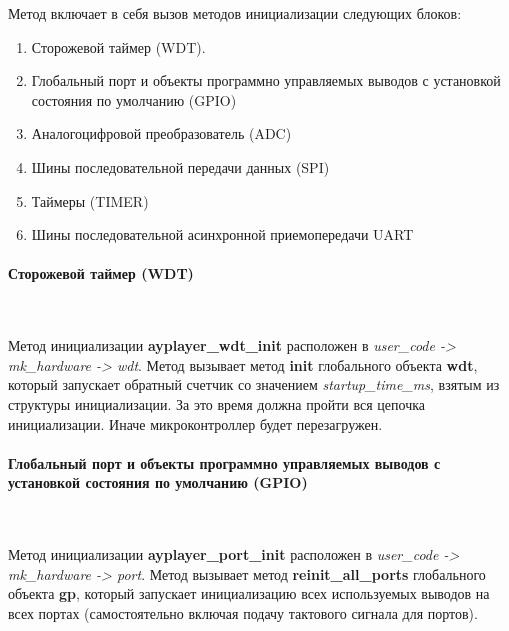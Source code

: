 \documentclass[a4paper, 12pt]{article}
\begin{document}
Метод включает в себя вызов методов инициализации следующих блоков:
\begin{enumerate}
	\item Сторожевой таймер (WDT).
	\item Глобальный порт и объекты программно управляемых выводов с установкой состояния по умолчанию (GPIO)
	\item Аналогоцифровой преобразователь (ADC)
	\item Шины последовательной передачи данных (SPI)
	\item Таймеры (TIMER)
	\item Шины последовательной асинхронной приемопередачи UART
\end{enumerate}
	
\paragraph{Сторожевой таймер (WDT)}~\

Метод инициализации \textbf{ayplayer\_wdt\_init} расположен в \textit{user\_\-code -> mk\_\-hardware -> wdt}. Метод вызывает метод \textbf{init} глобального объекта \textbf{wdt}, который запускает обратный счетчик со значением \textit{startup\_time\_ms}, взятым из структуры инициализации. За это время должна пройти вся цепочка инициализации. Иначе микроконтроллер будет перезагружен.

\paragraph{Глобальный порт и объекты программно управляемых выводов с установкой состояния по умолчанию (GPIO)}~\

Метод инициализации \textbf{ayplayer\_\-port\_\-init} расположен в \textit{user\_\-code -> mk\_\-hardware -> port}. Метод вызывает метод \textbf{reinit\_\-all\_\-ports} глобального объекта \textbf{gp}, который запускает инициализацию всех используемых выводов на всех портах (самостоятельно включая подачу тактового сигнала для портов).
\end{document}
